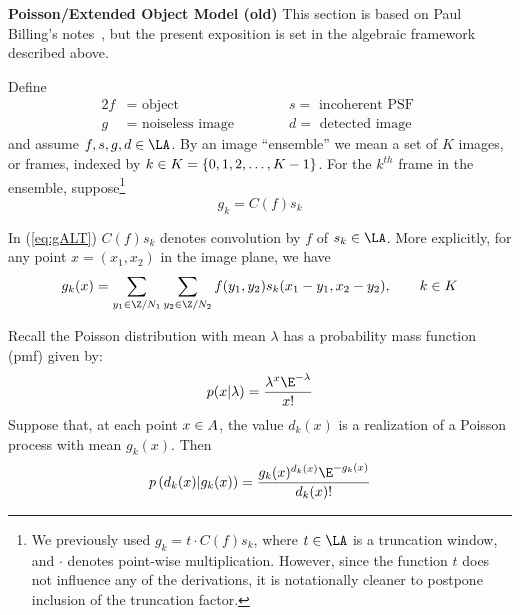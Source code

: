 \pagebreak


{\bf Poisson/Extended Object Model (old)}
This section is based on Paul Billing's notes~\cite{Billings:2001}, but the
present exposition is set in the algebraic framework
described above.

Define
\begin{alignat*}{2}
f &= \text{ object } \qquad  &&s= \text{ incoherent PSF }\\
g &= \text{ noiseless image } \qquad  &&d = \text{ detected image }
\end{alignat*}
and assume $f, s, g, d \in \LA$.
By an image ``ensemble'' we mean a set of $K$ images, or frames,
indexed by 
$k \in K = \{0, 1,2, \ldots,K-1\}$.
For the $k^{th}$ frame in the ensemble, suppose\footnote{We previously used $g_k =t\cdot C(f)s_k$,
where $t\in \LA$ is a truncation window, and $\cdot$ denotes point-wise
multiplication. 
However, since the function $t$ does not
influence any of the derivations, it is notationally cleaner to postpone
inclusion of the truncation factor.}
\begin{equation}\label{eq:gALT}
g_k = C(f)s_k %
\end{equation}

In (\ref{eq:gALT}) $C(f)s_k$ denotes convolution by $f$ of $s_k \in
\LA$. 
More explicitly, for any point $x = (x_1,x_2)$ in the image plane, we have
\[
g_k(x) = \sum_{y_1\in \Z/N_1}\sum_{y_2\in \Z/N_2} f(y_1,y_2)s_k(x_1-y_1,x_2-y_2),
\qquad k \in \groupK
\]

Recall the Poisson distribution with mean $\lambda$
has a probability mass function (pmf) given by:
\[
p(x|\lambda) = \frac{\lambda^x \E^{-\lambda}}{x!}
\]
Suppose that, at each point $x\in A$, the value $d_k(x)$ is a
realization of a Poisson process with mean $g_k(x)$.  Then 
\[
p\left(d_k(x)|g_k(x)\right) = \frac{g_k(x)^{d_k(x)} \E^{-g_k(x)}}{d_k(x)!}
\]

